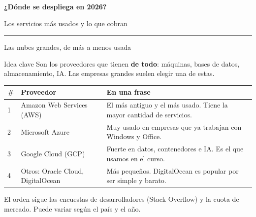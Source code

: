 \documentclass[aspectratio=169,10pt,c]{beamer}
\begin{document}
\begin{frame}[plain]
\vfill
\begin{center}
{\fontsize{29}{34}\selectfont\bfseries ¿Dónde se despliega en 2026?}\par
\vspace{2mm}
{\small Los servicios más usados y lo que cobran}\par
\vspace{4mm}
{\color{utpRojo}\rule{8.5cm}{1.2pt}}
\end{center}
\vfill
\end{frame}

\begin{frame}{Las nubes grandes, de más a menos usada}
\begin{block}{Idea clave}
\small Son los proveedores que tienen \textbf{de todo}: máquinas, bases de datos, almacenamiento, IA. Las empresas grandes suelen elegir una de estas.
\end{block}
\renewcommand{\arraystretch}{1.3}
\centering\small
\begin{tabular}{@{}p{0.5cm}p{4.8cm}p{7.6cm}@{}}
\toprule
\textbf{\#} & \textbf{Proveedor} & \textbf{En una frase}\\
\midrule
1 & Amazon Web Services (AWS) & El más antiguo y el más usado. Tiene la mayor cantidad de servicios.\\
2 & Microsoft Azure & Muy usado en empresas que ya trabajan con Windows y Office.\\
3 & Google Cloud (GCP) & Fuerte en datos, contenedores e IA. Es el que usamos en el curso.\\
4 & Otros: Oracle Cloud, DigitalOcean & Más pequeños. DigitalOcean es popular por ser simple y barato.\\
\bottomrule
\end{tabular}
\par\vspace{2mm}
\footnotesize El orden sigue las encuestas de desarrolladores (Stack Overflow) y la cuota de mercado. Puede variar según el país y el año.
\end{frame}
\end{document}
